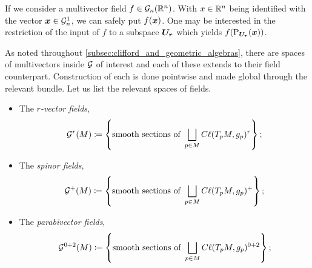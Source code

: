 \begin{remark}
\label{rem:input_projection}
    If we consider a multivector field $f \in \mathcal{G}_n(\mathbb{R}^n)$. With $x\in \mathbb{R}^n$ being identified with the vector $\boldsymbol{x} \in \mathcal{G}_n^1$, we can safely put $f(\boldsymbol{x})$.  One may be interested in the restriction of the input of $f$ to a subspace $\boldsymbol{U_r}$ which yields $f(\operatorname{P}_{\boldsymbol{U_r}}(\boldsymbol{x}))$.  
\end{remark}

As noted throughout \cref{subsec:clifford_and_geometric_algebras}, there are spaces of multivectors inside $\mathcal{G}$ of interest and each of these extends to their field counterpart. Construction of each is done pointwise and made global through the relevant bundle. Let us list the relevant spaces of fields.
\begin{itemize}
    \item The \emph{$r$-vector fields},
    \begin{equation}
        \mathcal{G}^r(M) \coloneqq \left\{\textrm{smooth sections of } \bigsqcup_{p \in M} C\ell(T_pM,g_p)^r\right\}; 
    \end{equation}
    \item The \emph{spinor fields},
    \begin{equation}
        \mathcal{G}^+(M) \coloneqq \left\{\textrm{smooth sections of } \bigsqcup_{p \in M} C\ell(T_pM,g_p)^+\right\};
    \end{equation}
    \item The \emph{parabivector fields},
    \begin{equation}
        \mathcal{G}^{0+2}(M) \coloneqq \left\{\textrm{smooth sections of } \bigsqcup_{p \in M}  C\ell(T_pM,g_p)^{0+2}\right\};
    \end{equation}
\end{itemize}
